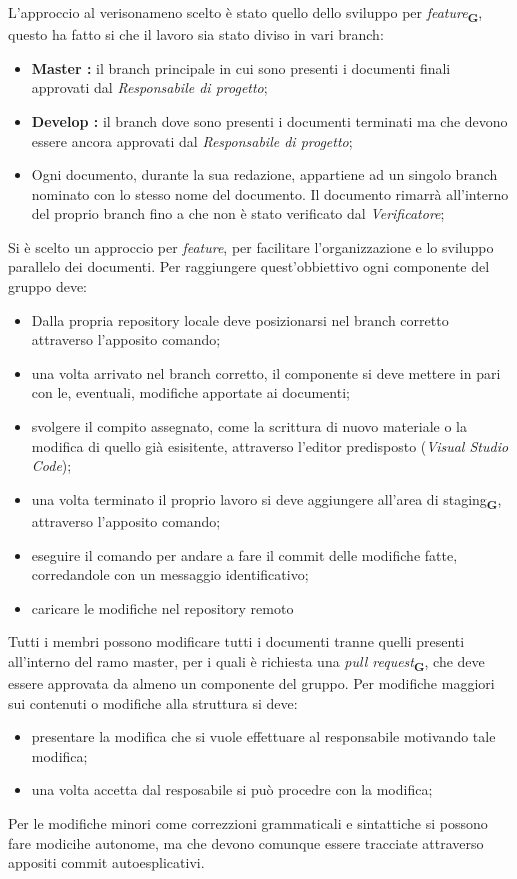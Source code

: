         L'approccio al verisonameno scelto è stato quello dello sviluppo per \textit{feature}\textsubscript{\textbf{G}}, questo ha fatto si che il lavoro sia stato diviso in vari branch:
        \begin{itemize}
            \item \textbf{Master :} il branch principale in cui sono presenti i documenti finali approvati dal \textit{Responsabile di progetto};
            \item \textbf{Develop :} il branch dove sono presenti i documenti terminati ma che devono essere ancora approvati dal \textit{Responsabile di progetto};
            \item Ogni documento, durante la sua redazione, appartiene ad un singolo branch nominato con lo stesso nome del documento. Il documento rimarrà all'interno del proprio branch fino a che non è stato verificato dal \textit{Verificatore};
        \end{itemize}
        Si è scelto un approccio per \textit{feature}, per facilitare l'organizzazione e lo sviluppo parallelo dei documenti. Per raggiungere quest'obbiettivo ogni componente del gruppo deve:
        \begin{itemize}
            \item Dalla propria repository locale deve posizionarsi nel branch corretto attraverso l'apposito comando;
            \item una volta arrivato nel branch corretto, il componente si deve mettere in pari con le, eventuali, modifiche apportate ai documenti;
            \item svolgere il compito assegnato, come la scrittura di nuovo materiale o la modifica di quello già esisitente, attraverso l'editor predisposto (\textit{Visual Studio Code});
            \item una volta terminato il proprio lavoro si deve aggiungere all'area di staging\textsubscript{\textbf{G}}, attraverso l'apposito comando;
            \item eseguire il comando per andare a fare il commit delle modifiche fatte, corredandole con un messaggio identificativo;
            \item caricare le modifiche nel repository remoto 
        \end{itemize}
        Tutti i membri possono modificare tutti i documenti tranne quelli presenti all'interno del ramo master, per i quali è richiesta una \textit{pull request}\textsubscript{\textbf{G}}, che deve essere approvata da almeno un componente del gruppo.
        Per modifiche maggiori sui contenuti o modifiche alla struttura si deve:
        \begin{itemize}
            \item presentare la modifica che si vuole effettuare al responsabile motivando tale modifica;
            \item una volta accetta dal resposabile si può procedre con la modifica; 
        \end{itemize} 
        Per le modifiche minori come correzzioni grammaticali e sintattiche si possono fare modicihe autonome, ma che devono comunque essere tracciate attraverso appositi commit autoesplicativi.
